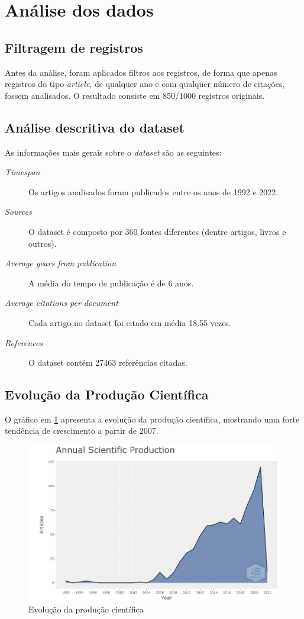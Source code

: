 \section{Análise dos dados}

\subsection{Filtragem de registros}
Antes da análise, foram aplicados filtros aos registros, de forma que apenas registros do tipo \textit{article}, de qualquer ano e com qualquer número de citações, fossem analisados. O resultado consiste em 850/1000 registros originais.

\subsection{Análise descritiva do dataset}

As informações mais gerais sobre o \textit{dataset} são as seguintes:
\begin{description}
    \item  [\textit{Timespan}] Os artigos analisados foram publicados entre os anos de 1992 e 2022.
    \item  [\textit{Sources}] O dataset é composto por 360 fontes diferentes (dentre artigos, livros e outros).
    \item 
    [\textit{Average years from publication}] A média do tempo de publicação é de 6 anos.
    \item 
    [\textit{Average citations per document}] Cada artigo no dataset foi citado em média 18.55 vezes.
    \item 
    [\textit{References}] O dataset contém 27463 referências citadas.
\end{description}

\subsection{Evolução da Produção Científica}

O gráfico em \ref{fig:gpu-prod-cient} apresenta a evolução da produção científica, mostrando uma forte tendência de crescimento a partir de 2007.

\begin{figure}[ht]
    \centering
    \includegraphics[width=12cm]{experiments/gustavo-tomas/AnaliseBibliometrica/GPUs/Graficos/gpu-prod-cient.png}
    \caption{Evolução da produção científica}
    \label{fig:gpu-prod-cient}
\end{figure}

